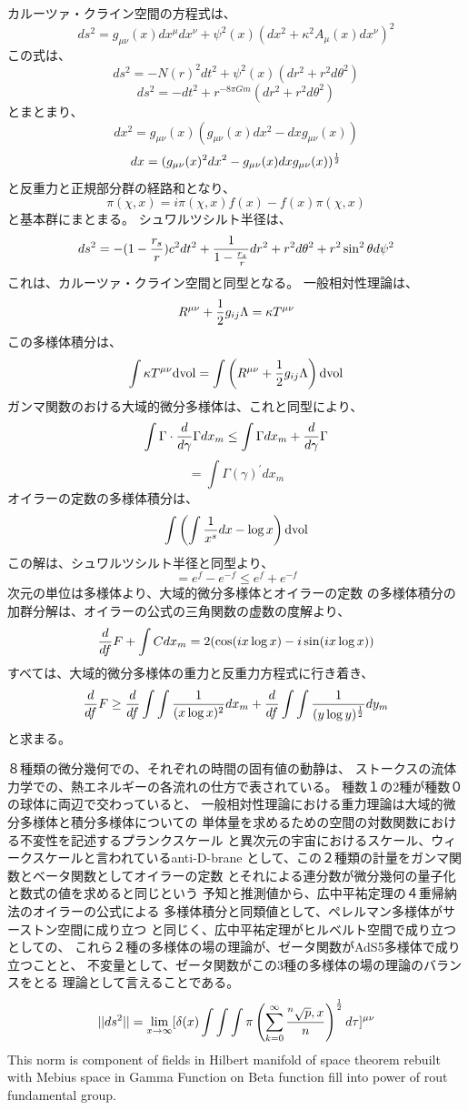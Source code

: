 \documentclass{jsarticle}
\begin{document}
 カルーツァ・クライン空間の方程式は、
    $$ ds^2 = g_{\mu\nu}(x)dx^{\mu}dx^{\nu} + \psi^2(x)(dx^2 + \kappa^2
    A_{\mu}(x)dx^{\nu})^2 $$
    この式は、
    $$ ds^2 = -N(r)^2dt^2 + \psi^2(x)(dr^2 + r^2d\theta^2) $$
    $$ ds^2 = -dt^2 + r^{-8\pi Gm}(dr^2 + r^2d\theta^2) $$
    とまとまり、
    $$ dx^2 = g_{\mu\nu}(x)(g_{\mu\nu}(x)dx^2 - dxg_{\mu\nu}(x)) $$
    $$ dx = (g_{\mu\nu}(x)^2dx^2 - g_{\mu\nu}(x)dx g_{\mu\nu}(x))^{1 \over 2} $$
    と反重力と正規部分群の経路和となり、　
    $$ \pi(\chi, x) = i \pi (\chi, x)f(x) - f(x)  \pi (\chi, x) $$
    と基本群にまとまる。
    シュワルツシルト半径は、
    $$ ds^2 = -(1 - {r_s \over r})c^2 dt^2 + {1 \over {{1 - {r_s \over r}}}} 
    dr^2 + r^2 d \theta^2 + r^2 \sin^2 \theta d \psi^2 $$
    これは、カルーツァ・クライン空間と同型となる。
    一般相対性理論は、
    $$ R^{\mu\nu} + {1 \over 2}g_{ij}\Lambda = \kappa T^{\mu\nu} $$
    この多様体積分は、
    $$ \int \kappa T^{\mu\nu}\mathrm{dvol} = \int  \left(R^{\mu\nu} + 
    {1 \over 2}g_{ij}\Lambda\right)\mathrm{dvol}  $$
    ガンマ関数のおける大域的微分多様体は、これと同型により、
    $$ \int \Gamma \cdot {d \over {d \gamma}}{\Gamma dx_m} \le \int \Gamma
    dx_m + {d \over d \gamma}\Gamma $$
    $$ = \int \Gamma(\gamma)^{'}dx_m $$
    オイラーの定数の多様体積分は、
    $$ \int \left({{\int {1 \over x^s}}dx - \log x} \right)\mathrm{dvol} $$
    この解は、シュワルツシルト半径と同型より、
    $$ = e^f - e^{-f} \le {e^f + e^{-f}} $$
    次元の単位は多様体より、大域的微分多様体とオイラーの定数
    の多様体積分の加群分解は、オイラーの公式の三角関数の虚数の度解より、
    $$ {d \over df}F + \int C dx_m = 2 (\cos (i x \log x) 
    - i \sin (i x \log x)) $$
    すべては、大域的微分多様体の重力と反重力方程式に行き着き、
    $$ {d \over df}F \ge {d \over df}\int \int{1 \over (x \log x)^2}dx_m
    + {d \over df}\int \int{1 \over (y \log y)^{1 \over 2}}dy_m $$
    と求まる。


  ８種類の微分幾何での、それぞれの時間の固有値の動静は、
  ストークスの流体力学での、熱エネルギーの各流れの仕方で表されている。
  種数１の2種が種数０の球体に両辺で交わっていると、
一般相対性理論における重力理論は大域的微分多様体と積分多様体についての 単体量を求めるための空間の対数関数における不変性を記述するプランクスケール と異次元の宇宙におけるスケール、ウィークスケールと言われているanti-D-brane として、この２種類の計量をガンマ関数とベータ関数としてオイラーの定数 とそれによる連分数が微分幾何の量子化と数式の値を求めると同じという 予知と推測値から、広中平祐定理の４重帰納法のオイラーの公式による 多様体積分と同類値として、ペレルマン多様体がサーストン空間に成り立つ と同じく、広中平祐定理がヒルベルト空間で成り立つとしての、 これら２種の多様体の場の理論が、ゼータ関数がAdS5多様体で成り立つことと、 不変量として、ゼータ関数がこの3種の多様体の場の理論のバランスをとる
  理論として言えることである。
$$ ||ds^2|| = \lim_{x \to \infty} [\delta(x) \int \int \int \pi \left( \sum_{k=0}^{\infty}
		{{}^n\sqrt{p},x \over n} \right)
^{1 \over 2}d \tau]^{\mu\nu} $$
  This norm is component of fields in Hilbert manifold of space theorem rebuilt with
Mebius space in Gamma Function on Beta function fill into power of rout fundamental
group.
\end{document}
